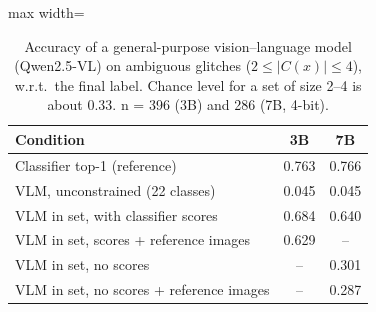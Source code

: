 \begin{table}[!htb]
\caption{Accuracy of a general-purpose vision--language model (Qwen2.5-VL) on ambiguous glitches
($2\le|C(x)|\le4$), w.r.t.\ the final label. Chance level for a set of size 2--4 is about 0.33.
n = 396 (3B) and 286 (7B, 4-bit).}\label{tab:e5}
\centering\scriptsize\setlength{\tabcolsep}{4pt}
\begin{adjustbox}{max width=\columnwidth}\begin{tabular}{lcc}\toprule
Condition & 3B & 7B\\\midrule
Classifier top-1 (reference) & 0.763 & 0.766\\
VLM, unconstrained (22 classes) & 0.045 & 0.045\\
VLM in set, with classifier scores & 0.684 & 0.640\\
VLM in set, scores + reference images & 0.629 & --\\
VLM in set, no scores & -- & 0.301\\
VLM in set, no scores + reference images & -- & 0.287\\
\bottomrule
\end{tabular}\end{adjustbox}
\end{table}
